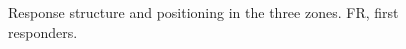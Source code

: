 \documentclass[final,5p,12pt,twocolumn]{elsaarticle}
\begin{document}
\begin{figure}[hbt!]
\caption{Response structure and positioning in the three zones.
FR, first responders.\label{fig3}}
\end{figure}




















\end{document}
